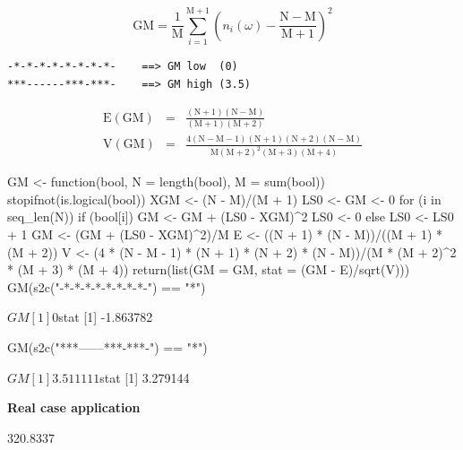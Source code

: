 \documentclass{article}
\begin{document}
$$
\mathrm{GM} = \frac{1}{\mathrm{M}}\sum_{i = 1}^{\mathrm{M+1}}{\left( n_i(\omega) - \mathrm{\frac{N-M}{M+1}} \right)^2}
$$

\begin{verbatim}
-*-*-*-*-*-*-*-*-    ==> GM low  (0)
***------***-***-    ==> GM high (3.5)
\end{verbatim}

\begin{eqnarray*}
\mathrm{E(GM)} & = & \mathrm{\frac{(N + 1)(N - M)}{(M +1)(M + 2)}} \\
\mathrm{V(GM)} & = & \mathrm{\frac{4(N - M - 1)(N + 1)(N + 2)(N - M)}{M(M + 2)^2(M + 3)(M + 4)}}
\end{eqnarray*}

\begin{Schunk}
\begin{Sinput}
 GM <- function(bool, N = length(bool), M = sum(bool)) {
     stopifnot(is.logical(bool))
     XGM <- (N - M)/(M + 1)
     LS0 <- GM <- 0
     for (i in seq_len(N)) {
         if (bool[i]) {
             GM <- GM + (LS0 - XGM)^2
             LS0 <- 0
         }
         else {
             LS0 <- LS0 + 1
         }
     }
     GM <- (GM + (LS0 - XGM)^2)/M
     E <- ((N + 1) * (N - M))/((M + 1) * (M + 2))
     V <- (4 * (N - M - 1) * (N + 1) * (N + 2) * (N - M))/(M * 
         (M + 2)^2 * (M + 3) * (M + 4))
     return(list(GM = GM, stat = (GM - E)/sqrt(V)))
 }
 GM(s2c("-*-*-*-*-*-*-*-*-") == "*")
\end{Sinput}
\begin{Soutput}
$GM
[1] 0

$stat
[1] -1.863782
\end{Soutput}
\begin{Sinput}
 GM(s2c("***------***-***-") == "*")
\end{Sinput}
\begin{Soutput}
$GM
[1] 3.511111

$stat
[1] 3.279144
\end{Soutput}
\end{Schunk}

\noindent\textbf{Real case application}

\begin{Schunk}
\begin{Soutput}
[1] 320.8337
\end{Soutput}
\end{Schunk}
\end{document}

